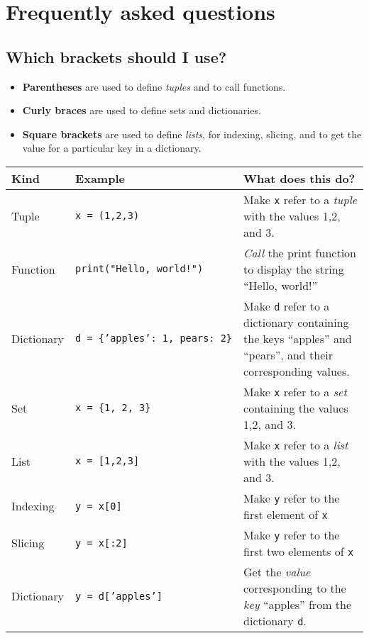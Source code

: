 \documentclass[12pt]{book}
\begin{document}
\chapter{Frequently asked questions}

\section{Which brackets should I use?}

\begin{itemize}
\item \textbf{Parentheses} are used to define \emph{tuples} and to call functions.
\item \textbf{Curly braces} are used to define sets and dictionaries.
\item \textbf{Square brackets} are used to define \emph{lists}, for indexing, slicing, and to get the value for a particular key in a dictionary.
\end{itemize}

\begin{table}[h]
\footnotesize
\begin{tabular}{llp{8cm}}
\toprule
Kind & Example & What does this do?\\
\midrule

Tuple & \texttt{x\ =\ (1,2,3)} & Make \texttt{x} refer to a \emph{tuple} with the values 1,2, and 3.\\

Function & \texttt{print("Hello,\ world!")} & \emph{Call} the print function to display the string ``Hello, world!''\\

Dictionary & \texttt{d\ =\ \{'apples':\ 1,\ pears:\ 2\}} & Make \texttt{d} refer to a dictionary containing the keys ``apples'' and ``pears'', and their corresponding values.\\

Set & \texttt{x\ =\ \{1,\ 2,\ 3\}} & Make \texttt{x} refer to a \emph{set} containing the values 1,2, and 3.\\

List & \texttt{x\ =\ {[}1,2,3{]}} & Make \texttt{x} refer to a \emph{list} with the values 1,2, and 3.\\

Indexing & \texttt{y\ =\ x{[}0{]}} & Make \texttt{y} refer to the first element of \texttt{x}\\

Slicing & \texttt{y\ =\ x{[}:2{]}} & Make \texttt{y} refer to the first two elements of \texttt{x}\\

Dictionary & \texttt{y\ =\ d{[}'apples'{]}} & Get the \emph{value} corresponding to the \emph{key} ``apples'' from the dictionary \texttt{d}.\\
\bottomrule
\end{tabular}
\end{table}
\end{document}

